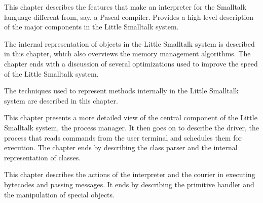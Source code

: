 \secup

\secup

\secdown

\secdown

This chapter describes the features that make an interpreter for the
Smalltalk language different from, say, a Pascal compiler. Provides a
high-level description of the major components in the Little Smalltalk
system.


\secup

\secdown

The internal representation of objects in the Little Smalltalk system is
described in this chapter, which also overviews the memory management algorithms. 
The chapter ends with a discussion of several optimizations used to 
improve the speed of the Little Smalltalk system.


\secup

\secdown

The techniques used to represent methods internally in the Little Smalltalk system are described in this chapter.


\secup

\secdown

This chapter presents a more detailed view of the central component
of the Little Smalltalk system, the process manager. It then goes on to
describe the driver, the process that reads commands from the user
terminal and schedules them for execution. The chapter ends by describing the class parser and the internal representation of classes.


\secup

\secdown

This chapter describes the actions of the interpreter and the courier
in executing bytecodes and passing messages. It ends by describing
the primitive handler and the manipulation of special objects.

